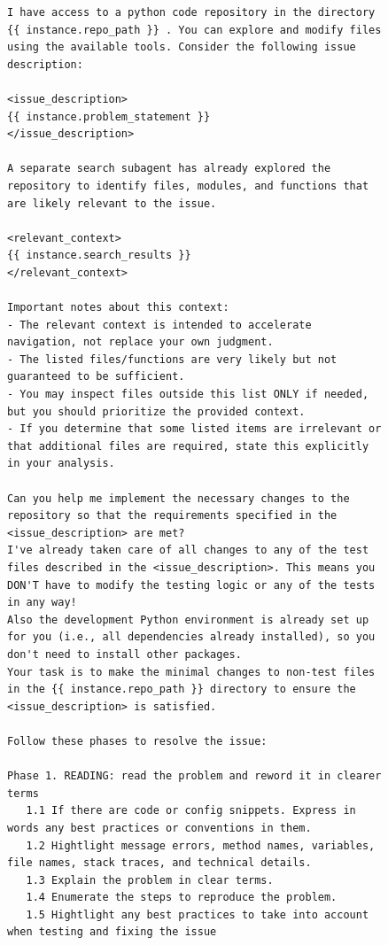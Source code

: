 \begin{figure}[!h]
    \centering
\begin{tcolorbox}[colback=blue!6!white, colframe=blue!45!white, title={\small User Prompt for OpenHands Issue Resolution Agent Augmented with Locations Retrieved by \methodname-14B (continued)}]
\begin{lstlisting}[basicstyle=\fontsize{7.7}{8}\ttfamily]
I have access to a python code repository in the directory {{ instance.repo_path }} . You can explore and modify files using the available tools. Consider the following issue description:

<issue_description>
{{ instance.problem_statement }}
</issue_description>

A separate search subagent has already explored the repository to identify files, modules, and functions that are likely relevant to the issue.

<relevant_context>
{{ instance.search_results }}
</relevant_context>

Important notes about this context:
- The relevant context is intended to accelerate navigation, not replace your own judgment.
- The listed files/functions are very likely but not guaranteed to be sufficient.
- You may inspect files outside this list ONLY if needed, but you should prioritize the provided context.
- If you determine that some listed items are irrelevant or that additional files are required, state this explicitly in your analysis.

Can you help me implement the necessary changes to the repository so that the requirements specified in the <issue_description> are met?
I've already taken care of all changes to any of the test files described in the <issue_description>. This means you DON'T have to modify the testing logic or any of the tests in any way!
Also the development Python environment is already set up for you (i.e., all dependencies already installed), so you don't need to install other packages.
Your task is to make the minimal changes to non-test files in the {{ instance.repo_path }} directory to ensure the <issue_description> is satisfied.

Follow these phases to resolve the issue:

Phase 1. READING: read the problem and reword it in clearer terms
   1.1 If there are code or config snippets. Express in words any best practices or conventions in them.
   1.2 Hightlight message errors, method names, variables, file names, stack traces, and technical details.
   1.3 Explain the problem in clear terms.
   1.4 Enumerate the steps to reproduce the problem.
   1.5 Hightlight any best practices to take into account when testing and fixing the issue


\end{lstlisting}
\end{tcolorbox}
\end{figure}
